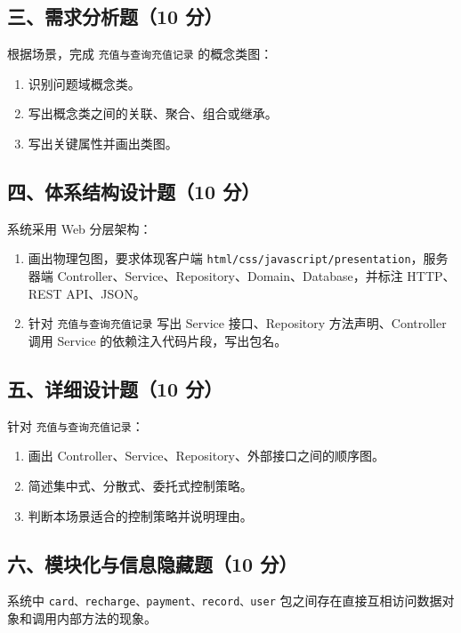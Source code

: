 \documentclass[UTF8,zihao=-4]{ctexart}
\begin{document}
\subsection{三、需求分析题（10 分）}


根据场景，完成 \texttt{充值与查询充值记录} 的概念类图：


\begin{enumerate}
\item 识别问题域概念类。
\item 写出概念类之间的关联、聚合、组合或继承。
\item 写出关键属性并画出类图。
\end{enumerate}


\subsection{四、体系结构设计题（10 分）}


系统采用 Web 分层架构：


\begin{enumerate}
\item 画出物理包图，要求体现客户端 \texttt{html/css/javascript/presentation}，服务器端 Controller、Service、Repository、Domain、Database，并标注 HTTP、REST API、JSON。
\item 针对 \texttt{充值与查询充值记录} 写出 Service 接口、Repository 方法声明、Controller 调用 Service 的依赖注入代码片段，写出包名。
\end{enumerate}


\subsection{五、详细设计题（10 分）}


针对 \texttt{充值与查询充值记录}：


\begin{enumerate}
\item 画出 Controller、Service、Repository、外部接口之间的顺序图。
\item 简述集中式、分散式、委托式控制策略。
\item 判断本场景适合的控制策略并说明理由。
\end{enumerate}


\subsection{六、模块化与信息隐藏题（10 分）}


系统中 \texttt{card、recharge、payment、record、user} 包之间存在直接互相访问数据对象和调用内部方法的现象。
\end{document}
